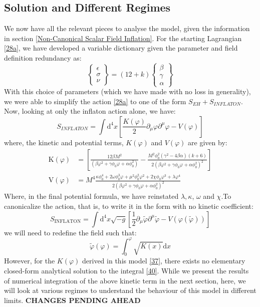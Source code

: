 \documentclass[aps,prd,reprint,preprintnumbers,showpacs,floatfix,nofootinbib,superscript address]{revtex4-2}
\begin{document}
\subsection{Solution and Different Regimes}
We now have all the relevant pieces to analyse the model, given the information in section \ref{Non-Canonical Scalar Field Inflation}. For the starting Lagrangian \ref{28a}, we have developed a variable dictionary given the parameter and field definition redundancy as:
\begin{equation} \label{35}
    \begin{Bmatrix}
        \epsilon \\ \sigma \\ \nu 
    \end{Bmatrix}
    = (12+k)
    \begin{Bmatrix}
        \beta \\ \gamma \\ \alpha
    \end{Bmatrix}
\end{equation}
With this choice of parameters (which we have made with no loss in generality), we were able to simplify the action \ref{28a} to one of the form $S_{EH} + S_{INFLATON}$. Now, looking at only the inflaton action alone, we have: 
\begin{equation}
    S_{INFLATON} = \int \text{d}^4x \left[ \frac{K(\varphi)}{2} \partial_\mu \varphi \partial^\mu \varphi - V(\varphi)\right]
\end{equation}
where, the kinetic and potential terms, $K(\varphi)$ and $V(\varphi)$ are given by:
\begin{align}
    \text{K}(\varphi) &= \left[\frac{12 \beta M^2}{(\beta \varphi^2 + \gamma\phi_0\varphi + \alpha \phi_0^2)} - \frac{M^2 \phi_0^2 (\gamma^2 - 4\beta\alpha)(k+6)}{2 (\beta \varphi^2 + \gamma\phi_0\varphi + \alpha \phi_0^2)^2}\right] \label{37} \\
    \text{V}(\varphi) &= M^4  \frac{ \kappa \phi_0^4 + 2\omega \phi_0^3 \varphi +\mu^2 \phi^2_0 \varphi^2 + 2\chi \phi_0 \varphi^3 + \lambda \varphi^4 }{2(\beta \varphi^2 + \gamma\phi_0\varphi + \alpha \phi_0^2)^2} \label{38}
\end{align}
Where, in the final potential formula, we have reinstated $\lambda, \kappa$, $\omega$ and $\chi$.To canonicalize the action, that is, to write it in the form with no kinetic coefficient:
\begin{equation}
    S_{\text{INFLATON}} = \int \text{d}^4x \sqrt{-g} \left[ \frac{1}{2}\partial_\mu \tilde{\varphi}\partial^\mu \tilde{\varphi} - V(\varphi(\tilde{\varphi})) \right]
\end{equation}
we will need to redefine the field such that:
\begin{equation} \label{40}
    \tilde{\varphi}(\varphi) = \int_0^{\varphi} \sqrt{K(x)} \text{d}x
\end{equation}
However, for the $K(\varphi)$ derived in this model \ref{37}, there exists no elementary closed-form analytical solution to the integral \ref{40}. While we present the results of numerical integration of the above kinetic term in the next section, here, we will look at various regimes to understand the behaviour of this model in different limits. \textbf{CHANGES PENDING AHEAD}
\end{document}
